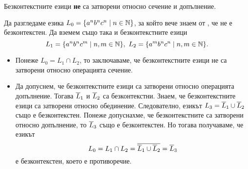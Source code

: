 \begin{framed}
  \begin{proposition}
    Безконтекстните езици {\bf не} са затворени относно сечение и допълнение.
  \end{proposition}
\end{framed}
\begin{hint}
  Да разгледаме езика $L_0 = \{a^nb^nc^n\mid n\in\mathbb{N}\}$, за който вече знаем от , че не е безконтекстен.
  Да вземем също така и безконтекстните езици 
  \[L_1 = \{a^nb^nc^m\mid n,m\in\mathbb{N}\},\ L_2 = \{a^mb^nc^n\mid n,m\in\mathbb{N}\}.\]
  \begin{itemize}
  \item 
    Понеже $L_0 = L_1\cap L_2$, то заключаваме, че безконтекстните езици не са затворени 
    относно операцията сечение.
  \item
    Да допуснем, че безконтекстните езици са затворени относно операцията допълнение.
    Тогава  $\overline{L}_1$ и $\overline{L}_2$ са безконтекстни.
    Знаем, че безконтекстните езици са затворени относно обединение. 
    Следователно, езикът $L_3 = \overline{L}_1 \cup \overline{L}_2$ също е безконтекстен.
    Понеже допуснахме, че безконтекстните са затворени относно допълнение, то $\overline{L}_3$ също е безконтекстен.
    Но тогава получаваме, че езикът
    \[L_0 = L_1 \cap L_2 = \overline{\overline{L}_1 \cup \overline{L}_2} = \overline{L}_3\]
    е безконтекстен, което е противоречие.
  \end{itemize}
\end{hint}


